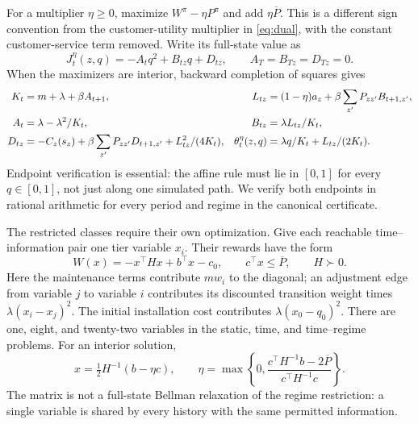 For a multiplier $\eta\geq0$, maximize $W^\pi-\eta P^\pi$ and add $\eta\overline P$. This is a different sign convention from the customer-utility multiplier in \eqref{eq:dual}, with the constant customer-service term removed. Write its full-state value as
\begin{equation}\label{eq:riccati-form}
 J_t^\eta(z,q)=-A_tq^2+B_{tz}q+D_{tz},\qquad A_T=B_{Tz}=D_{Tz}=0.
\end{equation}
When the maximizers are interior, backward completion of squares gives
\begin{align}
 K_t&=m+\lambda+\beta A_{t+1},&
 L_{tz}&=(1-\eta)a_z+\beta\sum_{z'}P_{zz'}B_{t+1,z'},\notag\\
 A_t&=\lambda-\lambda^2/K_t,& B_{tz}&=\lambda L_{tz}/K_t,\label{eq:riccati}\\
 D_{tz}&=-C_z(s_z)+\beta\sum_{z'}P_{zz'}D_{t+1,z'}+L_{tz}^2/(4K_t),&
 \theta_t^\eta(z,q)&=\lambda q/K_t+L_{tz}/(2K_t).\notag
\end{align}
Endpoint verification is essential: the affine rule must lie in $[0,1]$ for every $q\in[0,1]$, not just along one simulated path. We verify both endpoints in rational arithmetic for every period and regime in the canonical certificate.

The restricted classes require their own optimization. Give each reachable time--information pair one tier variable $x_i$. Their rewards have the form
\begin{equation}\label{eq:restricted-qp}
 W(x)=-x^\top Hx+b^\top x-c_0,\qquad c^\top x\leq\overline P,
 \qquad H\succ0.
\end{equation}
Here the maintenance terms contribute $m w_i$ to the diagonal; an adjustment edge from variable $j$ to variable $i$ contributes its discounted transition weight times $\lambda(x_i-x_j)^2$. The initial installation cost contributes $\lambda(x_0-q_0)^2$. There are one, eight, and twenty-two variables in the static, time, and time--regime problems. For an interior solution,
\[
 x=\tfrac12H^{-1}(b-\eta c),\qquad
 \eta=\max\left\{0,\frac{c^\top H^{-1}b-2\overline P}{c^\top H^{-1}c}\right\}.
\]
The matrix is not a full-state Bellman relaxation of the regime restriction: a single variable is shared by every history with the same permitted information.

